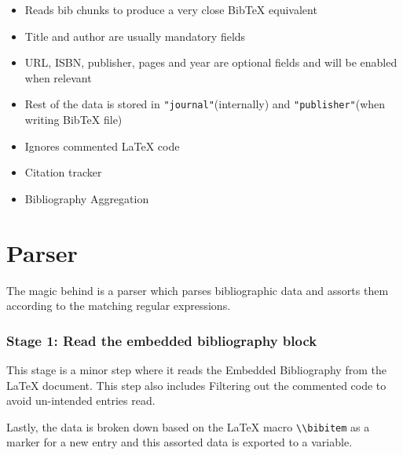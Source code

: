 \begin{itemize}
  \item Reads bib chunks to produce a very close BibTeX equivalent
  \item Title and author are usually mandatory fields
  \item URL, ISBN, publisher, pages and year are optional fields and will be enabled when relevant
  \item Rest of the data is stored in \verb|"journal"|(internally) and \verb|"publisher"|(when writing BibTeX file)
  \item Ignores commented LaTeX code 
  \item Citation tracker
  \item Bibliography Aggregation
\end{itemize}

\section{Parser}

The magic behind  is a parser which parses bibliographic data and assorts them according to the matching regular expressions.

\subsubsection{Stage 1: Read the embedded bibliography block}

This stage is a minor step where it reads the Embedded Bibliography from the LaTeX document. This step also includes Filtering out the commented code to avoid un-intended entries read.

Lastly, the data is broken down based on the LaTeX macro \verb|\\bibitem| as a marker for a new entry and this assorted data is exported to a variable.



